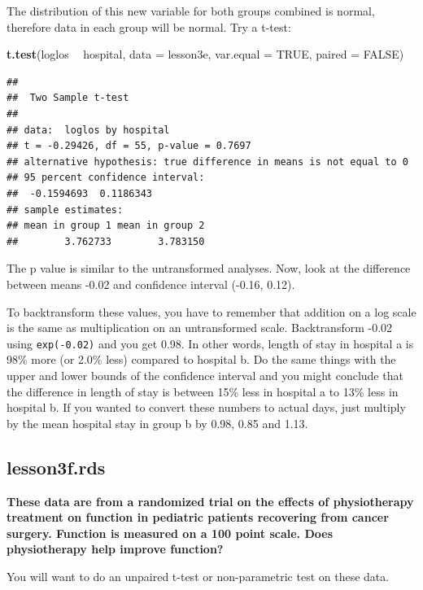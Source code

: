 \documentclass[]{book}
\newenvironment{Shaded}{\begin{snugshade}}{\end{snugshade}}
\newcommand{\DataTypeTok}[1]{\textcolor[rgb]{0.13,0.29,0.53}{#1}}
\newcommand{\KeywordTok}[1]{\textcolor[rgb]{0.13,0.29,0.53}{\textbf{#1}}}
\newcommand{\NormalTok}[1]{#1}
\newcommand{\OperatorTok}[1]{\textcolor[rgb]{0.81,0.36,0.00}{\textbf{#1}}}
\newcommand{\OtherTok}[1]{\textcolor[rgb]{0.56,0.35,0.01}{#1}}
\newcommand{\StringTok}[1]{\textcolor[rgb]{0.31,0.60,0.02}{#1}}
\begin{document}
The distribution of this new variable for both groups combined is
normal, therefore data in each group will be normal. Try a t-test:

\begin{Shaded}
\begin{Highlighting}[]
\KeywordTok{t.test}\NormalTok{(loglos }\OperatorTok{~}\StringTok{ }\NormalTok{hospital, }\DataTypeTok{data =}\NormalTok{ lesson3e, }\DataTypeTok{var.equal =} \OtherTok{TRUE}\NormalTok{, }\DataTypeTok{paired =} \OtherTok{FALSE}\NormalTok{)}
\end{Highlighting}
\end{Shaded}

\begin{verbatim}
## 
##  Two Sample t-test
## 
## data:  loglos by hospital
## t = -0.29426, df = 55, p-value = 0.7697
## alternative hypothesis: true difference in means is not equal to 0
## 95 percent confidence interval:
##  -0.1594693  0.1186343
## sample estimates:
## mean in group 1 mean in group 2 
##        3.762733        3.783150
\end{verbatim}

The p value is similar to the untransformed analyses. Now, look at the
difference between means -0.02 and confidence interval (-0.16, 0.12).

To backtransform these values, you have to remember that addition on a
log scale is the same as multiplication on an untransformed scale.
Backtransform -0.02 using \texttt{exp(-0.02)} and you get 0.98. In other
words, length of stay in hospital a is 98\% more (or 2.0\% less)
compared to hospital b. Do the same things with the upper and lower
bounds of the confidence interval and you might conclude that the
difference in length of stay is between 15\% less in hospital a to 13\%
less in hospital b. If you wanted to convert these numbers to actual
days, just multiply by the mean hospital stay in group b by 0.98, 0.85
and 1.13.

\hypertarget{lesson3f.rds}{%
\subsection{lesson3f.rds}\label{lesson3f.rds}}

\textbf{These data are from a randomized trial on the effects of
physiotherapy treatment on function in pediatric patients recovering
from cancer surgery. Function is measured on a 100 point scale. Does
physiotherapy help improve function?}

You will want to do an unpaired t-test or non-parametric test on these
data.
\end{document}
